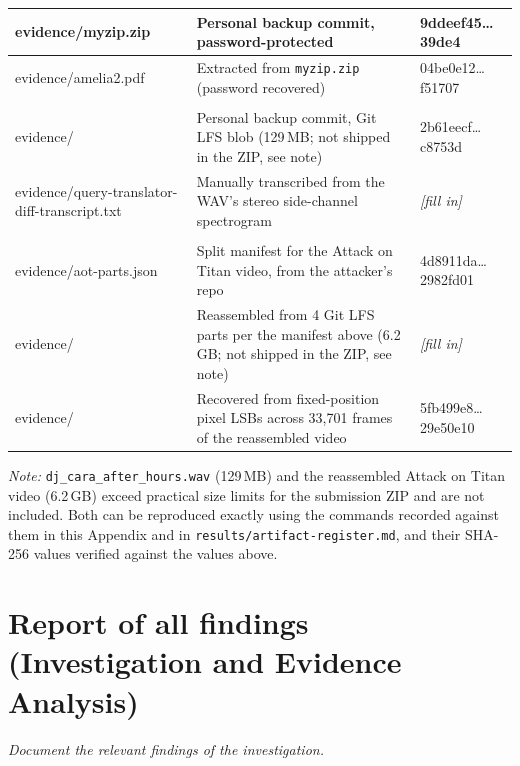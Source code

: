 \documentclass[11pt,a4paper,final,oneside]{article}
\begin{document}
\begin{xltabular}{\textwidth}{
>{\centering\arraybackslash}p{0.25\textwidth}
>{\centering\arraybackslash}p{0.22\textwidth}
>{\centering\arraybackslash}X}
\hline
evidence/myzip.zip & Personal backup commit, password-protected & 9ddeef45\ldots{}39de4 \\
\hline
evidence/amelia2.pdf & Extracted from \texttt{myzip.zip} (password recovered) & 04be0e12\ldots{}f51707 \\
\hline
{} \\
\hline
evidence/ & Personal backup commit, Git LFS blob (129\,MB; not shipped in the ZIP, see note) & 2b61eecf\ldots{}c8753d \\
\hline
evidence/query-translator-diff-transcript.txt & Manually transcribed from the WAV's stereo side-channel spectrogram & \textit{[fill in]} \\
\hline
{} \\
\hline
evidence/aot-parts.json & Split manifest for the Attack on Titan video, from the attacker's repo & 4d8911da\ldots{}2982fd01 \\
\hline
evidence/ & Reassembled from 4 Git LFS parts per the manifest above (6.2\,GB; not shipped in the ZIP, see note) & \textit{[fill in]} \\
\hline
evidence/ & Recovered from fixed-position pixel LSBs across 33{,}701 frames of the reassembled video & 5fb499e8\ldots{}29e50e10 \\
\hline
\end{xltabular}

\textit{Note:} \texttt{dj\_cara\_after\_hours.wav} (129\,MB) and the reassembled Attack on
Titan video (6.2\,GB) exceed practical size limits for the submission ZIP and are not
included. Both can be reproduced exactly using the commands recorded against them in this
Appendix and in \texttt{results/artifact-register.md}, and their SHA-256 values verified
against the values above.

\section{Report of all findings (Investigation and Evidence Analysis)}
\label{sec:report-of-all-findings}

\textit{Document the relevant findings of the investigation.}
\end{document}
